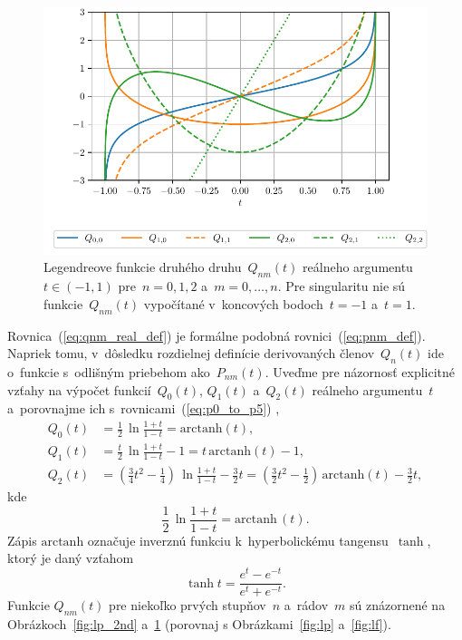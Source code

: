 \documentclass[a4paper, 12pt]{book}
\begin{document}
\begin{figure}
\centering
\includegraphics{./fig-legendre-functions-qnm.pdf}
\caption{Legendreove funkcie druhého druhu~$Q_{nm}(t)$ reálneho argumentu $t 
\in (-1, 1)$ pre~$n = 0, 1, 2$ a~$m = 0, \dots, n$.  Pre singularitu nie sú 
funkcie~$Q_{nm}(t)$ vypočítané v~koncových bodoch~$t = -1$ a~$t = 1$.}
\label{fig:lf_2nd}
\end{figure}

Rovnica~(\ref{eq:qnm_real_def}) je formálne podobná rovnici~(\ref{eq:pnm_def}).  
Napriek tomu, v~dôsledku rozdielnej definície derivovaných členov~$Q_n(t)$ ide 
o~funkcie s~odlišným priebehom ako~$P_{nm}(t)$.  Uveďme pre názornosť 
explicitné vzťahy na výpočet funkcií~$Q_0\left( t \right)$, $Q_1\left( 
t \right)$ a~$Q_2\left( t \right)$ reálneho argumentu~$t$ a~porovnajme ich 
s~rovnicami~(\ref{eq:p0_to_p5})
\parencite{MoritzPhysicalGeodesy},
%
\begin{align}
\label{eq:q0t}
Q_0(t) &= \frac{1}{2} \, \ln\frac{1 + t}{1 - t} = \mathrm{arctanh}(t){,}\\
%
\label{eq:q1t}
Q_1(t) &= \frac{t}{2} \, \ln\frac{1 + t}{1 - t} - 1 = t \, \mathrm{arctanh}(t)- 
 1{,}\\
%
\label{eq:q2t}
Q_2(t) &= \left( \frac{3}{4} t^2 - \frac{1}{4} \right) \, \ln\frac{1 + t}{1 
- t} - \frac{3}{2}t = \left( \frac{3}{2} t^2 - \frac{1}{2} \right) \, 
\mathrm{arctanh}(t) - \frac{3}{2}t{,}
\end{align}
%
kde
%
\begin{equation}
\label{eq:tanh}
\frac{1}{2} \, \ln \frac{1 + t}{1 - t} = \mathrm{arctanh} \, (t){.}
\end{equation}
%
Zápis $\mathrm{arctanh}$ označuje inverznú funkciu k~hyperbolickému 
tangensu~$\tanh$, ktorý je daný vzťahom \parencite{Gradshteyn2007}
%
\begin{equation}
\tanh t = \frac{e^t - e^{-t}}{e^t + e^{-t}}{.}
\end{equation}
%
Funkcie $Q_{nm}(t)$ pre niekoľko prvých stupňov~$n$ a~rádov~$m$ sú znázornené 
na Obrázkoch~\ref{fig:lp_2nd} a~\ref{fig:lf_2nd} (porovnaj 
s Obrázkami~\ref{fig:lp} a~\ref{fig:lf}).
\end{document}
